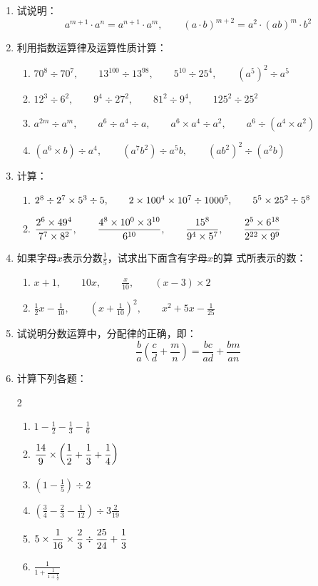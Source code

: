 \begin{enumerate}
	\item 试说明： $$a^{m+1} \cdot a^{n}=a^{n+1} \cdot a^{m},\qquad 
	(a \cdot b)^{m+2}=a^{2} \cdot(a b)^{m} \cdot b^{2}
	$$
	\item 
	利用指数运算律及运算性质计算：
	\begin{enumerate}
		\item $70^{8}\div 70^{7},\qquad 13^{100}\div 13^{98},\qquad 5^{10}\div 25^{4}, \qquad \left(a^{5}\right)^{2}\div a^{5}$
		\item $12^{3}\div 6^{2},\qquad 9^{4}\div 27^{2} ,\qquad 81^{2}\div 9^{4} ,\qquad 125^{2}\div 25^{2}$
		\item $a^{2 m} \div a^{m},\qquad a^{6}\div a^{4} \div a ,\qquad a^{6} \times a^{4} \div a^{2},\qquad a^{6}\div\left(a^{4} \times a^{2}\right)$
		\item $\left(a^{6} \times b\right)\div a^{4},\qquad \left(a^{7} b^{2}\right)\div a^{5} b ,\qquad \left(a b^{2}\right)^{2}\div \left(a^{2} b\right)$
	\end{enumerate}
	
	\item 计算：
	\begin{enumerate}
		\item $2^8\div 2^7\times 5^3\div 5,\qquad 2\times 100^4\times 10^7\div 1000^5,\qquad 5^5\times 25^2\div 5^8$
		\item $\dfrac{2^6\times 49^4}{7^7\times 8^2},\qquad \dfrac{4^8\times 10^0\times 3^{10}}{6^{10}},\qquad \dfrac{15^8}{9^4\times 5^7},\qquad \dfrac{2^5\times 6^{18}}{2^{22}\times 9^9}$
	\end{enumerate}
	
	\item 如果字母$x$表示分数$\frac{1}{5}$，试求出下面含有字母$x$的算
	式所表示的数：
	\begin{enumerate}
		\item $x+1,\qquad 10x,\qquad \frac{x}{10},\qquad (x-3)\times 2$
		\item $\frac{1}{2}x-\frac{1}{10},\qquad \left(x+\frac{1}{10}\right)^2,\qquad x^2+5x-\frac{1}{25}$
	\end{enumerate}
	
	\item 试说明分数运算中，分配律的正确，即：
	\[\frac{b}{a}\left(\frac{c}{d}+\frac{m}{n}\right)=\frac{bc}{ad}+\frac{bm}{an} \]
	
	\item 计算下列各题：
	\begin{multicols}{2}
		\begin{enumerate}
			\item $1-\frac{1}{2}-\frac{1}{3}-\frac{1}{6}$
			\item $\dfrac{14}{9}\times\left(\dfrac{1}{2}+\dfrac{1}{3}+\dfrac{1}{4}\right)$
			\item $\left(1-\frac{1}{5}\right)\div 2$
			\item $\left(\frac{3}{4}-\frac{2}{3}-\frac{1}{12}\right)\div 3\frac{2}{19}$
			\item $5\times \dfrac{1}{16}\times \dfrac{2}{3}\div \dfrac{25}{24}+\dfrac{1}{3}$
			\item $\frac{1}{1+\frac{1}{1+\frac{1}{2}}}$
		\end{enumerate}
	\end{multicols}
	

\end{enumerate}
